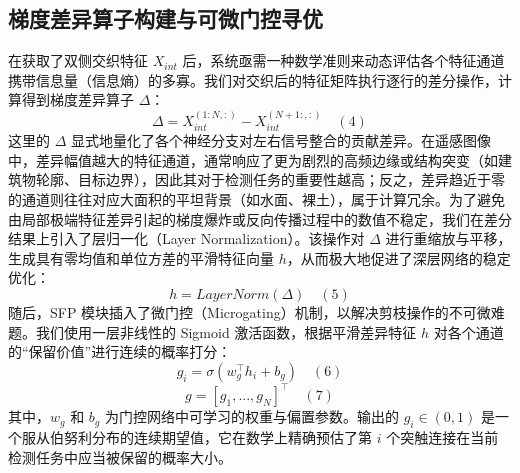 \subsection{梯度差异算子构建与可微门控寻优}
在获取了双侧交织特征 $X_{int}$ 后，系统亟需一种数学准则来动态评估各个特征通道携带信息量（信息熵）的多寡。我们对交织后的特征矩阵执行逐行的差分操作，计算得到梯度差异算子 $\Delta$：$$\Delta = X_{int}^{(1:N,:)} - X_{int}^{(N+1:,:)} \quad (4)$$这里的 $\Delta$ 显式地量化了各个神经分支对左右信号整合的贡献差异。在遥感图像中，差异幅值越大的特征通道，通常响应了更为剧烈的高频边缘或结构突变（如建筑物轮廓、目标边界），因此其对于检测任务的重要性越高；反之，差异趋近于零的通道则往往对应大面积的平坦背景（如水面、裸土），属于计算冗余。为了避免由局部极端特征差异引起的梯度爆炸或反向传播过程中的数值不稳定，我们在差分结果上引入了层归一化（Layer Normalization）。该操作对 $\Delta$ 进行重缩放与平移，生成具有零均值和单位方差的平滑特征向量 $h$，从而极大地促进了深层网络的稳定优化：$$h = LayerNorm(\Delta) \quad (5)$$随后，SFP 模块插入了微门控（Microgating）机制，以解决剪枝操作的不可微难题。我们使用一层非线性的 Sigmoid 激活函数，根据平滑差异特征 $h$ 对各个通道的“保留价值”进行连续的概率打分：$$g_i = \sigma(w_g^\top h_i + b_g) \quad (6)$$$$g = [g_1, ..., g_N]^\top \quad (7)$$其中，$w_g$ 和 $b_g$ 为门控网络中可学习的权重与偏置参数。输出的 $g_i \in (0, 1)$ 是一个服从伯努利分布的连续期望值，它在数学上精确预估了第 $i$ 个突触连接在当前检测任务中应当被保留的概率大小。

